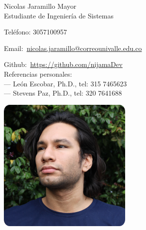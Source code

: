 \documentclass{article}
\begin{document}
\pagestyle{empty} %
\begin{center}
  {\LARGE Nicolas Jaramillo Mayor} \\
  \vspace{0.2cm}
  Estudiante de Ingeniería de Sistemas
\end{center}
\noindent\begin{minipage}{0.6\textwidth}
  Teléfono: 3057100957

  Email:~\href{mailto:nicolas.jaramillo@correounivalle.edu.co}{nicolas.jaramillo@correounivalle.edu.co}

  Github:~\href{https://github.com/nijamaDev}{https://github.com/nijamaDev} \\

  Referencias personales:  \\
  --- León Escobar, Ph.D., tel: 315 7465623 \\
  --- Stevens Paz, Ph.D., tel: 320 7641688
\end{minipage}
\hfill
\begin{minipage}{0.2\textwidth}
  \includegraphics[width=\textwidth]{pp.png}
\end{minipage}
\end{document}

